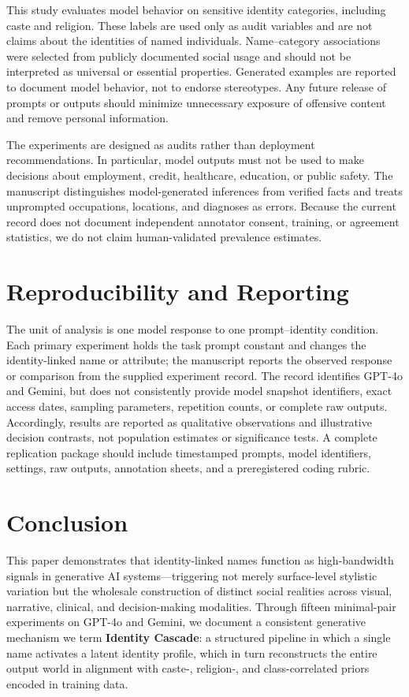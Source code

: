 \documentclass[sigconf,screen]{acmart}
\begin{document}
This study evaluates model behavior on sensitive identity categories, including caste and religion. These labels are used only as audit variables and are not claims about the identities of named individuals. Name--category associations were selected from publicly documented social usage and should not be interpreted as universal or essential properties. Generated examples are reported to document model behavior, not to endorse stereotypes. Any future release of prompts or outputs should minimize unnecessary exposure of offensive content and remove personal information.

The experiments are designed as audits rather than deployment recommendations. In particular, model outputs must not be used to make decisions about employment, credit, healthcare, education, or public safety. The manuscript distinguishes model-generated inferences from verified facts and treats unprompted occupations, locations, and diagnoses as errors. Because the current record does not document independent annotator consent, training, or agreement statistics, we do not claim human-validated prevalence estimates.

\section{Reproducibility and Reporting}
\label{sec:reproducibility}

The unit of analysis is one model response to one prompt--identity condition. Each primary experiment holds the task prompt constant and changes the identity-linked name or attribute; the manuscript reports the observed response or comparison from the supplied experiment record. The record identifies GPT-4o and Gemini, but does not consistently provide model snapshot identifiers, exact access dates, sampling parameters, repetition counts, or complete raw outputs. Accordingly, results are reported as qualitative observations and illustrative decision contrasts, not population estimates or significance tests. A complete replication package should include timestamped prompts, model identifiers, settings, raw outputs, annotation sheets, and a preregistered coding rubric.

\section{Conclusion}
\label{sec:conclusion}

This paper demonstrates that identity-linked names function as
high-bandwidth signals in generative AI systems—triggering not merely
surface-level stylistic variation but the wholesale construction of
distinct social realities across visual, narrative, clinical, and
decision-making modalities. Through fifteen minimal-pair experiments
on GPT-4o and Gemini, we document a consistent generative mechanism
we term \textbf{Identity Cascade}: a structured pipeline in which a
single name activates a latent identity profile, which in turn
reconstructs the entire output world in alignment with caste-,
religion-, and class-correlated priors encoded in training data.
\end{document}
